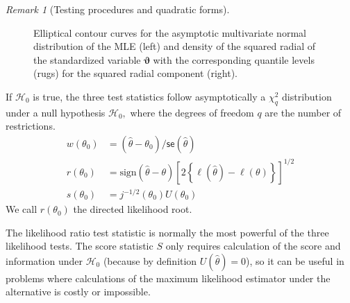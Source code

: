 \documentclass[
  11pt,
  letterpaper,
]{scrbook}
\theoremstyle{plain}
\theoremstyle{plain}
\theoremstyle{definition}
\theoremstyle{definition}
\theoremstyle{remark}
\newtheorem{refremark}{Remark}[chapter]
\begin{document}
\begin{refremark}[Testing procedures and quadratic forms]
\begin{figure}[ht!]
{}

\caption{\label{fig-ellipses}Elliptical contour curves for the
asymptotic multivariate normal distribution of the MLE (left) and
density of the squared radial of the standardized variable
\(\boldsymbol{\vartheta}\) with the corresponding quantile levels (rugs)
for the squared radial component (right).}

\end{figure}%

\label{rem-nulldist}

\end{refremark}

If \(\mathscr{H}_0\) is true, the three test statistics follow
asymptotically a \(\chi^2_q\) distribution under a null hypothesis
\(\mathscr{H}_0,\) where the degrees of freedom \(q\) are the number of
restrictions. \begin{align*}
w(\theta_0)&=(\widehat{\theta}-\theta_0)/\mathsf{se}(\widehat{\theta}) \\
r({\theta_0}) &= \mathrm{sign}(\widehat{\theta}-\theta)\left[2
\left\{\ell(\widehat{\theta})-\ell(\theta)\right\}\right]^{1/2} \\
s(\theta_0)&=j^{-1/2}(\theta_0)U(\theta_0)
\end{align*} We call \(r({\theta_0})\) the directed likelihood root.

The likelihood ratio test statistic is normally the most powerful of the
three likelihood tests. The score statistic \(S\) only requires
calculation of the score and information under \(\mathscr{H}_0\)
(because by definition \(U(\widehat{\theta})=0\)), so it can be useful
in problems where calculations of the maximum likelihood estimator under
the alternative is costly or impossible.
\end{document}
